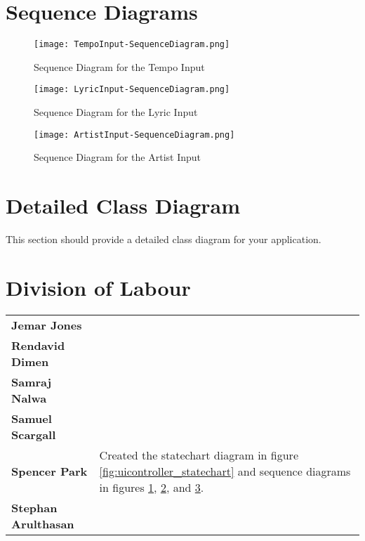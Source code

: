 \documentclass[]{article}
\begin{document}
\section{Sequence Diagrams}
\label{sec:sequence_diagrams}
\begin{figure}
	\centering
	\texttt{[image: TempoInput-SequenceDiagram.png]}
	\caption{Sequence Diagram for the Tempo Input}
	\label{fig:tempo_input_sequence}
\end{figure}

\begin{figure}
	\centering
	\texttt{[image: LyricInput-SequenceDiagram.png]}
	\caption{Sequence Diagram for the Lyric Input}
	\label{fig:lyric_input_sequence}
\end{figure}

\begin{figure}
	\centering
	\texttt{[image: ArtistInput-SequenceDiagram.png]}
	\caption{Sequence Diagram for the Artist Input}
	\label{fig:artist_input_sequence}
\end{figure}
\FloatBarrier

\section{Detailed Class Diagram}
\label{sec:detailed_class_diagram}
This section should provide a detailed class diagram for your application.

\appendix
\newpage
\section{Division of Labour}
\label{sec:division_of_labour}
\noindent\begin{tabular}{l l}
	\textbf{Jemar Jones} & \\
	\textbf{Rendavid Dimen} & \\
	\textbf{Samraj Nalwa} & \\
	\textbf{Samuel Scargall} & \\
	\textbf{Spencer Park} & Created the statechart diagram in figure \ref{fig:uicontroller_statechart} and sequence diagrams in figures \ref{fig:tempo_input_sequence}, \ref{fig:lyric_input_sequence}, and \ref{fig:artist_input_sequence}.\\
	\textbf{Stephan Arulthasan} & \\
\end{tabular}
\\
\end{document}
